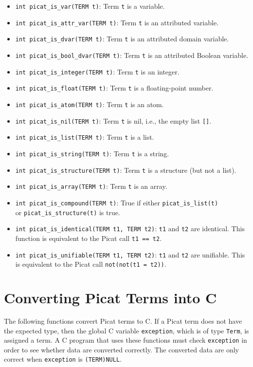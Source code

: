 \begin{itemize}
\item \texttt{int picat\_is\_var(TERM t)}: Term \texttt{t} is a variable.   
\item \texttt{int picat\_is\_attr\_var(TERM t)}: Term \texttt{t} is an attributed variable.   
\item \texttt{int picat\_is\_dvar(TERM t)}: Term \texttt{t} is an attributed domain variable.   
\item \texttt{int picat\_is\_bool\_dvar(TERM t)}: Term \texttt{t} is an attributed Boolean variable.   
\item \texttt{int picat\_is\_integer(TERM t)}: Term \texttt{t} is an integer.   
\item \texttt{int picat\_is\_float(TERM t)}: Term \texttt{t} is a floating-point number.   
\item \texttt{int picat\_is\_atom(TERM t)}: Term \texttt{t} is an atom.   
\item \texttt{int picat\_is\_nil(TERM t)}: Term \texttt{t} is nil, i.e., the empty list \texttt{[]}.   
\item \texttt{int picat\_is\_list(TERM t)}: Term \texttt{t} is a list.   
\item \texttt{int picat\_is\_string(TERM t)}: Term \texttt{t} is a string.
\item \texttt{int picat\_is\_structure(TERM t)}: Term \texttt{t} is a structure (but not a list).   
\item \texttt{int picat\_is\_array(TERM t)}: Term \texttt{t} is an array.   
\item \texttt{int picat\_is\_compound(TERM t)}: True if either \texttt{picat\_is\_list(t)} \\ or \texttt{picat\_is\_structure(t)} is true.   
\item \texttt{int picat\_is\_identical(TERM t1, TERM t2)}: \texttt{t1} and \texttt{t2} are identical. This function is equivalent to the Picat call \texttt{t1 == t2}.
\item \texttt{int picat\_is\_unifiable(TERM t1, TERM t2)}: \texttt{t1} and \texttt{t2} are unifiable. This is equivalent to the Picat call \texttt{not(not(t1 = t2))}.
\end{itemize}

\section{Converting Picat Terms into C}
The following functions convert Picat terms to C. If a Picat term does not have the expected type, then the global C variable \texttt{exception}, which is of type \texttt{Term}, is assigned a term. A C program that uses these functions must check \texttt{exception} in order to see whether data are converted correctly. The converted data are only correct when \texttt{exception} is \texttt{(TERM)NULL}.

